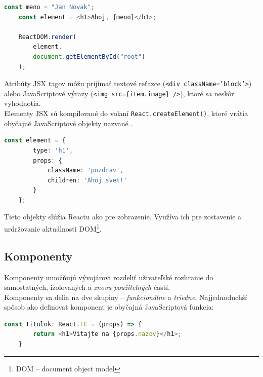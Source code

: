 \begin{lstlisting}[language=TypeScript, caption=Príklad využitia JSX v~React aplikácií. \cite{React}]
	const meno = "Jan Novak";
	const element = <h1>Ahoj, {meno}</h1>;

	ReactDOM.render(
		element,
		document.getElementById("root")
	);
\end{lstlisting}

\medskip

\noindent Atribúty JSX tagov môžu prijímať textové reťazce (\texttt{<div className='block'>}) alebo JavaScriptové výrazy (\texttt{<img src=\{item.image\} />}), ktoré sa neskôr vyhodnotia. \\

\noindent Elementy JSX sú kompilované do volaní \texttt{React.createElement()}, ktoré vrátia obyčajné JavaScriptové objekty nazvané . \cite{React} \\

\begin{lstlisting}[language=TypeScript, caption=Príklad jednoduchého React elementu po kompilácií. \cite{React}]
	const element = {
		type: 'h1',
		props: {
			className: 'pozdrav',
			children: 'Ahoj svet!'
		}
	};
\end{lstlisting}

\medskip

\noindent Tieto objekty slúžia Reactu ako  pre zobrazenie. Využíva ich pre zostavenie a urdržovanie aktuálnosti DOM\footnote{DOM -- document object model}. \cite{React}

\subsection{Komponenty}
\label{theory:components}
Komponenty umožňujú vývojárovi rozdeliť uživateľské rozhranie do samostatných, izolovaných a \emph{znovu použiteľných} častí. \cite{React} \\

\noindent Komponenty sa delia na dve skupiny -- \emph{funkcionálne} a \emph{triedne}. Najjednoduchší spôsob ako definovať komponent je obyčajná JavaScriptová funkcia: \\

\begin{lstlisting}[language=TypeScript, caption=Príklad definície funkcionálneho komponentu.]
	const Titulok: React.FC = (props) => {
		return <h1>Vitajte na {props.nazov}</h1>;
	}
\end{lstlisting}

